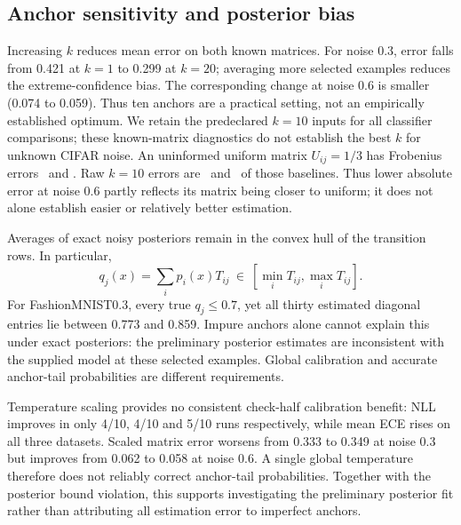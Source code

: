 \documentclass[12pt]{article}
\begin{document}
\subsection{Anchor sensitivity and posterior bias}
\begin{table}[H]\centering\fontsize{11}{13}\selectfont\setlength{\tabcolsep}{3pt}
\caption{Known-matrix Frobenius error, mean $\pm$ population SD on ten shared preliminary fits. Scaled $k=10$ uses noisy-validation temperature fitting.}
\label{tab:anchors}\end{table}
Increasing $k$ reduces mean error on both known matrices. For noise 0.3, error falls from 0.421 at $k=1$ to 0.299 at $k=20$; averaging more selected examples reduces the extreme-confidence bias. The corresponding change at noise 0.6 is smaller (0.074 to 0.059). Thus ten anchors are a practical setting, not an empirically established optimum. We retain the predeclared $k=10$ inputs for all classifier comparisons; these known-matrix diagnostics do not establish the best $k$ for unknown CIFAR noise.
An uninformed uniform matrix $U_{ij}=1/3$ has Frobenius errors \FMaUniformError\ and \FMbUniformError. Raw $k=10$ errors are \FMaUniformRelative\ and \FMbUniformRelative\ of those baselines. Thus lower absolute error at noise 0.6 partly reflects its matrix being closer to uniform; it does not alone establish easier or relatively better estimation.

Averages of exact noisy posteriors remain in the convex hull of the transition rows. In particular,
\begin{equation}
q_j(x)=\sum_i p_i(x)T_{ij}\ \in\ [\min_iT_{ij},\max_iT_{ij}].
\label{eq:bound}
\end{equation}
For FashionMNIST0.3, every true $q_j\leq0.7$, yet all thirty estimated diagonal entries lie between 0.773 and 0.859. Impure anchors alone cannot explain this under exact posteriors: the preliminary posterior estimates are inconsistent with the supplied model at these selected examples. Global calibration and accurate anchor-tail probabilities are different requirements.

\begin{table}[H]\centering\fontsize{11}{13}\selectfont\setlength{\tabcolsep}{3pt}
\caption{Temperature and noisy check-half calibration, mean $\pm$ population SD. ECE is expressed as a percentage; NLL is unscaled.}
\label{tab:calibration}\end{table}
Temperature scaling provides no consistent check-half calibration benefit: NLL improves in only 4/10, 4/10 and 5/10 runs respectively, while mean ECE rises on all three datasets. Scaled matrix error worsens from 0.333 to 0.349 at noise 0.3 but improves from 0.062 to 0.058 at noise 0.6. A single global temperature therefore does not reliably correct anchor-tail probabilities. Together with the posterior bound violation, this supports investigating the preliminary posterior fit rather than attributing all estimation error to imperfect anchors.
\end{document}
